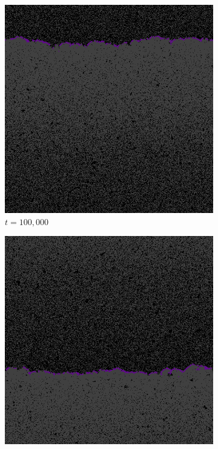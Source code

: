 \begin{figure}
\begin{subfigure}{.12\textwidth}
 \centering
 \includegraphics[width=1\linewidth]{img/sm100000}
 \caption{$t=100,000$}
\end{subfigure}%
\begin{subfigure}{.12\textwidth}
 \centering
 \includegraphics[width=1\linewidth]{img/sm200000}

\end{subfigure}
\end{figure}
